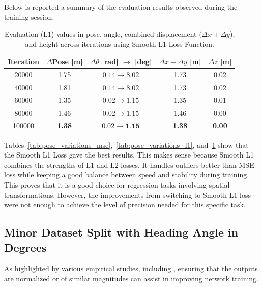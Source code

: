 Below is reported a summary of the evaluation results observed during the training session:
\begin{table}[H]
    \centering
    \scriptsize
    \renewcommand{\arraystretch}{1.2} 
    \setlength{\tabcolsep}{10pt} 
    \begin{tabular}{c c c c c}
        \toprule
        \textbf{Iteration} & \textbf{$\Delta$Pose [m]} & \textbf{$\Delta \theta$ [rad] $\rightarrow$ [deg]} & \textbf{$\Delta x + \Delta y$ [m]} & \textbf{$\Delta z$ [m]} \\
        \midrule
        \num{20000}  & 1.75 & $0.14 \rightarrow 8.02$  & 1.73 & 0.02 \\
        \num{40000}  & 1.81 & $0.14 \rightarrow 8.02$  & 1.73 & 0.02 \\
        \num{60000}  & 1.35 & $0.02 \rightarrow 1.15$  & 1.35 & 0.01 \\
        \num{80000}  & 1.46 & $0.02 \rightarrow 1.15$  & 1.46 & 0.00 \\
        \num{100000} & \textbf{1.38} & $0.02 \rightarrow \textbf{1.15}$  & \textbf{1.38} & \textbf{0.00} \\
        \bottomrule
    \end{tabular}
    \caption{Evaluation (L1) values in pose, angle, combined displacement ($\Delta x + \Delta y$), and height across iterations using Smooth L1 Loss Function.}
    \label{tab:pose_variations_l1s}
\end{table}

Tables~\ref{tab:pose_variations_mse},~\ref{tab:pose_variations_l1}, and~\ref{tab:pose_variations_l1s} show that the Smooth L1 Loss gave the best results. This makes sense because Smooth L1 combines the strengths of L1 and L2 losses. It handles outliers better than MSE loss while keeping a good balance between speed and stability during training. This proves that it is a good choice for regression tasks involving spatial transformations. However, the improvements from switching to Smooth L1 loss were not enough to achieve the level of precision needed for this specific task.

\subsection*{Minor Dataset Split with Heading Angle in Degrees}
As highlighted by various empirical studies, including \cite{yu2022normalizationeffectsdeepneural}, ensuring that the outputs are normalized or of similar magnitudes can assist in improving network training.

